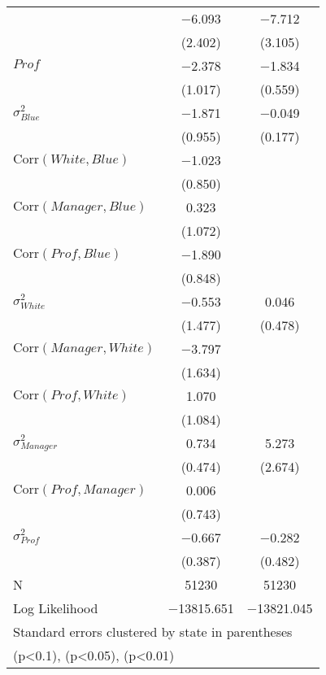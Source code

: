{\begin{longtable}{lcc}
  & $-$6.093\sym{**}
  & $-$7.712\sym{**} \\
  & (2.402)
  & (3.105) \\
  $\mathit{Prof}$
  & $-$2.378\sym{**}
  & $-$1.834\sym{***}\\
  & (1.017)
  & (0.559) \\
  $\sigma^2_{\mathit{Blue}}$
  & $-$1.871\sym{**}
  & $-$0.049 \\
  & (0.955)
  & (0.177) \\
  $\mathrm{Corr}(\mathit{White}, \mathit{Blue})$
  & $-$1.023 & \\
  & (0.850) & \\
  $\mathrm{Corr}(\mathit{Manager}, \mathit{Blue})$
  & 0.323 & \\
  & (1.072) & \\
  $\mathrm{Corr}(\mathit{Prof}, \mathit{Blue})$
  & $-$1.890\sym{**} & \\
  & (0.848) & \\
  $\sigma^2_{\mathit{White}}$
  & $-$0.553
  & 0.046 \\
  & (1.477)
  & (0.478) \\
  $\mathrm{Corr}(\mathit{Manager}, \mathit{White})$
  & $-$3.797\sym{**} & \\
  & (1.634) & \\
  $\mathrm{Corr}(\mathit{Prof}, \mathit{White})$
  & 1.070 & \\
  & (1.084) & \\
  $\sigma^2_{\mathit{Manager}}$
  & 0.734
  & 5.273\sym{**} \\
  & (0.474)
  & (2.674) \\
  $\mathrm{Corr}(\mathit{Prof}, \mathit{Manager})$
  & 0.006 & \\
  & (0.743) & \\
  $\sigma^2_{\mathit{Prof}}$
  & $-$0.667\sym{*}
  & $-$0.282 \\
  & (0.387)
  & (0.482) \\
  \bottomrule
  N & 51230 & 51230 \\
  Log Likelihood&  $-$13815.651 & $-$13821.045 \\
  \bottomrule
  \multicolumn{3}{l}{\tiny Standard errors clustered by state in parentheses} \\
  \multicolumn{3}{l}{\tiny \sym{*} (p<0.1), \sym{**} (p<0.05), \sym{***} (p<0.01)}
\end{longtable}
}
